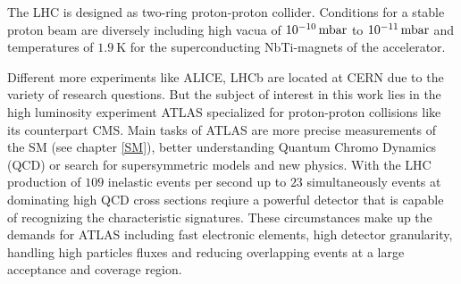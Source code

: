 The LHC is designed as two-ring proton-proton collider. Conditions for a stable proton beam are diversely including high vacua of $\SI{E-10}{\milli\bar}$ to $\SI{E-11}{\milli\bar}$ and temperatures of $\SI{1.9}{\kelvin}$ for the superconducting NbTi-magnets of the accelerator. \cite{LHCJINST}   
\par
Different more experiments like ALICE\cite{ALICE}, LHCb\cite{LHCb} are located at CERN due to the variety of research questions. But the subject of interest in this work lies in the high luminosity experiment ATLAS specialized for proton-proton collisions like its counterpart CMS\cite{CMS}. Main tasks of ATLAS are more precise measurements of the SM (see chapter \ref{SM}), better understanding Quantum Chromo Dynamics (QCD) or search for supersymmetric models and new physics. With the LHC production of $109$ inelastic events per second up to $23$ simultaneously events at dominating high QCD cross sections reqiure a powerful detector that is capable of recognizing the characteristic signatures. These circumstances make up the demands for ATLAS including fast electronic elements, high detector granularity, handling high particles fluxes and reducing overlapping events at a large acceptance and coverage region. \cite{ATLASJINST}       
